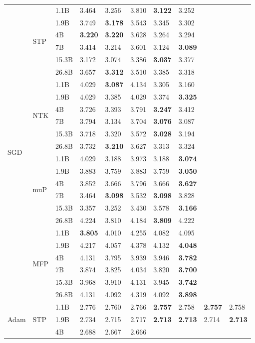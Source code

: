 \documentclass{article}
\theoremstyle{plain}
\theoremstyle{definition}
\theoremstyle{remark}
\begin{document}
\begin{table}[h!]
{\begin{tabularx}{1.65\textwidth}{XXX | XXXXXXX}
\multirow{24}{*}{\Large SGD} & \multirow{6}{*}{\Large STP } & 1.1B & 3.464 & 3.256 & 3.810 & \textbf{3.122} & 3.252 &  &  \\ &  & 1.9B & 3.749 & \textbf{3.178} & 3.543 & 3.345 & 3.302 &  &  \\ &  & 4B & \textbf{3.220} & \textbf{3.220} & 3.628 & 3.264 & 3.294 &  &  \\ &  & 7B & 3.414 & 3.214 & 3.601 & 3.124 & \textbf{3.089} &  &  \\ &  & 15.3B & 3.172 & 3.074 & 3.386 & \textbf{3.037} & 3.377 &  &  \\ &  & 26.8B & 3.657 & \textbf{3.312} & 3.510 & 3.385 & 3.318 &  &  \\  \cmidrule{2-10}  & \multirow{6}{*}{\Large NTK } & 1.1B & 4.029 & \textbf{3.087} & 4.134 & 3.305 & 3.160 &  &  \\ &  & 1.9B & 4.029 & 3.385 & 4.029 & 3.374 & \textbf{3.325} &  &  \\ &  & 4B & 3.726 & 3.393 & 3.791 & \textbf{3.247} & 3.412 &  &  \\ &  & 7B & 3.794 & 3.134 & 3.704 & \textbf{3.076} & 3.087 &  &  \\ &  & 15.3B & 3.718 & 3.320 & 3.572 & \textbf{3.028} & 3.194 &  &  \\ &  & 26.8B & 3.732 & \textbf{3.210} & 3.627 & 3.313 & 3.324 &  &  \\  \cmidrule{2-10}  & \multirow{6}{*}{\Large muP } & 1.1B & 4.029 & 3.188 & 3.973 & 3.188 & \textbf{3.074} &  &  \\ &  & 1.9B & 3.883 & 3.759 & 3.883 & 3.759 & \textbf{3.050} &  &  \\ &  & 4B & 3.852 & 3.666 & 3.796 & 3.666 & \textbf{3.627} &  &  \\ &  & 7B & 3.464 & \textbf{3.098} & 3.532 & \textbf{3.098} & 3.828 &  &  \\ &  & 15.3B & 3.357 & 3.252 & 3.430 & 3.578 & \textbf{3.166} &  &  \\ &  & 26.8B & 4.224 & 3.810 & 4.184 & \textbf{3.809} & 4.222 &  &  \\  \cmidrule{2-10}  & \multirow{6}{*}{\Large MFP } & 1.1B & \textbf{3.805} & 4.010 & 4.255 & 4.082 & 4.095 &  &  \\ &  & 1.9B & 4.217 & 4.057 & 4.378 & 4.132 & \textbf{4.048} &  &  \\ &  & 4B & 4.131 & 3.795 & 3.939 & 3.946 & \textbf{3.782} &  &  \\ &  & 7B & 3.874 & 3.825 & 4.034 & 3.820 & \textbf{3.700} &  &  \\ &  & 15.3B & 3.968 & 3.910 & 4.131 & 3.945 & \textbf{3.742} &  &  \\ &  & 26.8B & 4.131 & 4.092 & 4.319 & 4.092 & \textbf{3.898} &  &  \\  \midrule[\heavyrulewidth] \multirow{24}{*}{\Large Adam} & \multirow{6}{*}{\Large STP } & 1.1B & 2.776 & 2.760 & 2.766 & \textbf{2.757} & 2.758 & \textbf{2.757} & 2.758 \\ &  & 1.9B & 2.734 & 2.715 & 2.717 & \textbf{2.713} & \textbf{2.713} & 2.714 & \textbf{2.713} \\ &  & 4B & 2.688 & 2.667 & 2.666 & 
\end{tabularx}}
\end{table}
\end{document}

